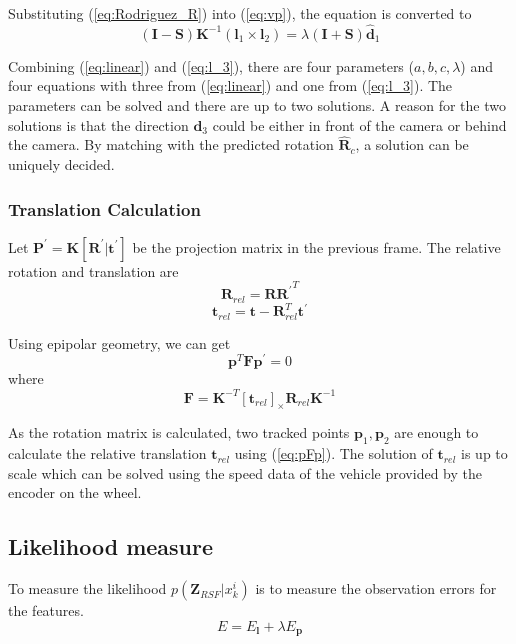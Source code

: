 \documentclass[letterpaper, 10 pt, conference]{ieeeconf}  %
\begin{document}
Substituting (\ref{eq:Rodriguez_R}) into (\ref{eq:vp}), the equation is converted to
\begin{equation}
(\mathbf{I}-\mathbf{S})\mathbf{K}^{-1}(\mathbf{l}_1\times \mathbf{l}_2)
= \lambda (\mathbf{I}+\mathbf{S})\hat{\mathbf{d}}_1
\label{eq:linear}
\end{equation}

Combining (\ref{eq:linear}) and (\ref{eq:l_3}), there are four parameters ($a,b,c,\lambda$) and four equations with three from (\ref{eq:linear}) and one from (\ref{eq:l_3}). The parameters can be solved and there are up to two solutions.  A reason for the two solutions is that the direction $\mathbf{d}_3$ could be either in front of the camera or behind the camera. By matching with the predicted rotation $\hat{\mathbf{R}}_c$, a solution can be uniquely decided.

\subsubsection{Translation Calculation}
Let $\mathbf{P}^\prime=\mathbf{K}[\mathbf{R}^\prime|\mathbf{t}^\prime]$ be the projection matrix in the previous frame. The relative rotation and translation are
\begin{equation}
\mathbf{R}_{rel} = \mathbf{R} {\mathbf{R}^\prime}^T
\end{equation}
\begin{equation}
\mathbf{t}_{rel}=\mathbf{t} - \mathbf{R}_{rel}^T \mathbf{t}^\prime
\end{equation}

Using epipolar geometry, we can get
\begin{equation}
\mathbf{p}^T \mathbf{F} \mathbf{p}^\prime=0
\label{eq:pFp}
\end{equation}
where
\begin{equation}
\mathbf{F} = \mathbf{K}^{-T} {\left[\mathbf{t}_{rel}\right]}_\times \mathbf{R}_{rel} \mathbf{K}^{-1}
\label{eq:F}
\end{equation}

As the rotation matrix is calculated, two tracked points $\mathbf{p}_1,\mathbf{p}_2$ are enough to calculate the relative translation $\mathbf{t}_{rel}$ using (\ref{eq:pFp}). The solution of $\mathbf{t}_{rel}$ is up to scale which can be solved using the speed data of the vehicle provided by the encoder on the wheel.

\subsection{Likelihood measure}
To measure the likelihood $p(\mathbf{Z}_{RSF} | x_k^i)$ is to measure the observation errors for the features.
\begin{equation}
E= E_\mathbf{l} + \lambda E_\mathbf{p}
\end{equation}
\end{document}
